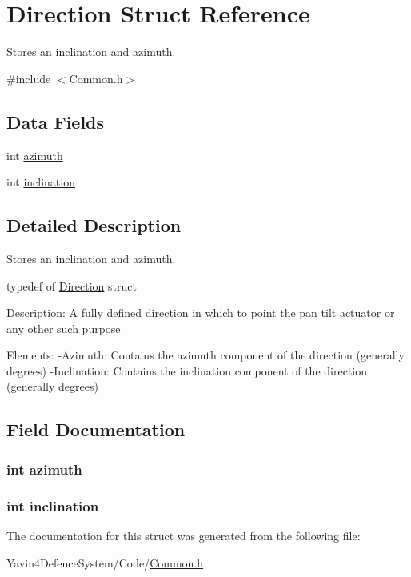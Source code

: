 \hypertarget{structDirection}{\section{Direction Struct Reference}
\label{structDirection}
}


Stores an inclination and azimuth.  




{\ttfamily \#include $<$Common.\+h$>$}

\subsection*{Data Fields}
\begin{DoxyCompactItemize}
\item 
int \hyperlink{structDirection_a866e78e12cb32dcaf1ded89bda8be8f5}{azimuth}
\item 
int \hyperlink{structDirection_af308b9934394c8bcf7614eb1df2d863f}{inclination}
\end{DoxyCompactItemize}


\subsection{Detailed Description}
Stores an inclination and azimuth. 



 typedef of \hyperlink{structDirection}{Direction} struct

Description\+: A fully defined direction in which to point the pan tilt actuator or any other such purpose

Elements\+: -\/\+Azimuth\+: Contains the azimuth component of the direction (generally degrees) -\/\+Inclination\+: Contains the inclination component of the direction (generally degrees) 

\subsection{Field Documentation}
\hypertarget{structDirection_a866e78e12cb32dcaf1ded89bda8be8f5}{
\subsubsection[{azimuth}]{\setlength{\rightskip}{0pt plus 5cm}int azimuth}}\label{structDirection_a866e78e12cb32dcaf1ded89bda8be8f5}
\hypertarget{structDirection_af308b9934394c8bcf7614eb1df2d863f}{
\subsubsection[{inclination}]{\setlength{\rightskip}{0pt plus 5cm}int inclination}}\label{structDirection_af308b9934394c8bcf7614eb1df2d863f}


The documentation for this struct was generated from the following file\+:\begin{DoxyCompactItemize}
\item 
Yavin4\+Defence\+System/\+Code/\hyperlink{Common_8h}{Common.\+h}\end{DoxyCompactItemize}
